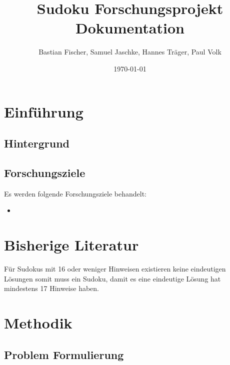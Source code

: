 \documentclass[12pt,a4paper]{article}
\title{Sudoku Forschungsprojekt Dokumentation}
\author{Bastian Fischer, Samuel Jaschke, Hannes Träger, Paul Volk}
\date{\today}
\begin{document}
\maketitle

\begin{abstract}
\end{abstract}

\section{Einführung}
\subsection{Hintergrund}

\subsection{Forschungsziele}
Es werden folgende Forschungsziele behandelt:
\begin{itemize}
    \item  
\end{itemize}

\section{Bisherige Literatur}
Für Sudokus mit 16 oder weniger Hinweisen existieren keine eindeutigen Lösungen \cite{DBLP:journals/corr/abs-1201-0749} somit muss ein Sudoku, damit es eine eindeutige Lösung hat mindestens 17 Hinweise haben.
\section{Methodik}

\subsection{Problem Formulierung}
\end{document}
